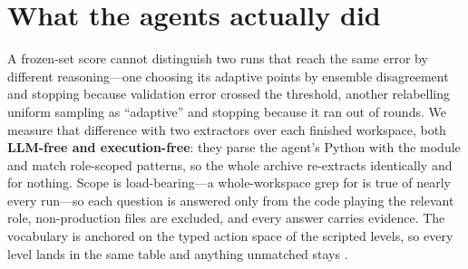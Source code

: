 \section{What the agents actually did}
\label{sec:agentlogic}

A frozen-set score cannot distinguish two runs that reach the same error by
different reasoning---one choosing its adaptive points by ensemble disagreement
and stopping because validation error crossed the threshold, another relabelling
uniform sampling as ``adaptive'' and stopping because it ran out of rounds. We
measure that difference with two extractors over each finished workspace, both
\textbf{LLM-free and execution-free}: they parse the agent's Python with the
 module and match role-scoped patterns, so the whole archive
re-extracts identically and for nothing. Scope is load-bearing---a
whole-workspace grep for  is true of nearly every run---so each
question is answered only from the code playing the relevant role,
non-production files are excluded, and every answer carries 
evidence. The vocabulary is anchored on the typed action space of the scripted
levels, so every level lands in the same table and anything unmatched stays
.

